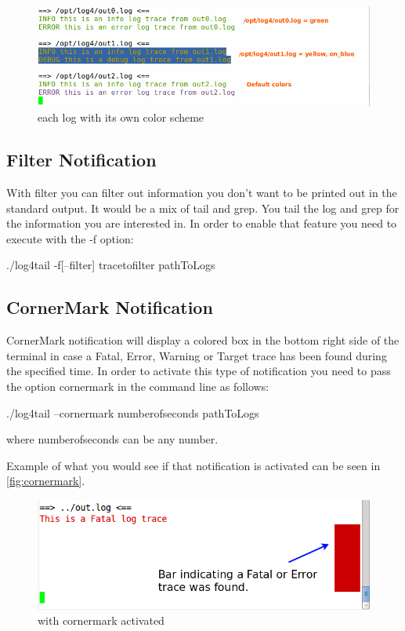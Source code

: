 \begin{figure}[ht]
\centering
\includegraphics[scale=0.60]{multiple_colors.png}
\caption{\logftailer{} each log with its own color scheme}\label{fig:multiple_colors}
\end{figure}



\subsection{Filter Notification}
\label{sec:filter}
With filter you can filter out information you don't want to be printed out 
in the standard output. It would be a mix of tail and grep. You tail the log 
and grep for the information you are interested in. In order to enable that 
feature you need to execute \logftailer{} with the -f option:

\begin{cmd}
  ./log4tail -f[--filter] tracetofilter pathToLogs
\end{cmd}

\subsection{CornerMark Notification}
\label{sec:cornermark}
CornerMark notification will display a colored box in the bottom right side of
the terminal in case a Fatal, Error, Warning or Target trace has been found during the specified
time. In order to activate this type of notification you need to pass the
option cornermark in the command line as follows:

\begin{cmd}
  ./log4tail --cornermark numberofseconds pathToLogs
\end{cmd}
where numberofseconds can be any number. 

Example of what you would see if that notification is activated can be seen in
 \autoref{fig:cornermark}.

\begin{figure}[ht]
\centering
\includegraphics[scale=0.60]{terminalcornermark.png}
\caption{\logftailer{} with cornermark activated}\label{fig:cornermark}
\end{figure}

